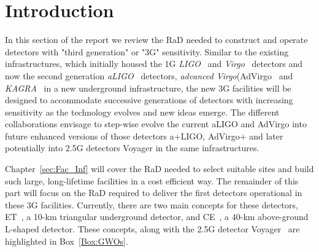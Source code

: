 \chapter{Introduction}
\label{sec:Intro}
\setcounter{page}{1}
\vspace{-1.5cm}
In this section of the report we review the \ac{RaD} needed to construct and operate detectors with "third generation" or "\ac{3G}" sensitivity. 
Similar to the existing infrastructures, which initially housed the \ac{1G} \textit{\ac{LIGO}}~\cite{Abbott_2009} and \textit{\ac{Virgo}}~\cite{Virgo2012} detectors and now the second generation \textit{\ac{aLIGO}}~\cite{AdvancedLIGO2015} detectors, \textit{advanced Virgo}(\ac{AdVirgo}~\cite{AdvancedVirgo2015} and \textit{\ac{KAGRA}}~\cite{KAGRA2013} in a new underground infrastructure, the new \ac{3G} facilities will be designed to accommodate successive generations of detectors with increasing sensitivity as the technology evolves and new ideas emerge.
The different collaborations envisage to step-wise evolve the current \ac{aLIGO} and \ac{AdVirgo} into future enhanced versions of those detectors \ac{a+LIGO}, \ac{AdVirgo+} \cite{Zucker:LIGOAplus, Cagnoli:VirgoAplus} and later potentially into \ac{2.5G}  detectors \ac{Voyager}\cite{VoyagerDCC2018} in the same infrastructures.

 Chapter~\ref{sec:Fac_Inf} will cover the \ac{RaD} needed to select suitable sites and build such large, long-lifetime facilities in a cost efficient way. The remainder of this part will focus on the \ac{RaD} required to deliver the first detectors operational in these \ac{3G} facilities.  Currently, there are two main concepts for these detectors, \acf{ET}~\cite{ET2011}, a 10-km triangular underground detector, and \acf{CE}~\cite{CosmicExplorer2017}, a 40-km above-ground L-shaped detector. These concepts, along with the \ac{2.5G}  detector \ac{Voyager}~\cite{Voyager:Inst,VoyagerDCC2018} are highlighted in Box~\ref{Box:GWOs}.

